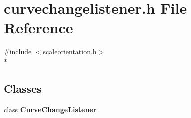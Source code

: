 \section{curvechangelistener.\+h File Reference}
\label{bk3_2curve_2curvechangelistener_8h}
{\ttfamily \#include $<$scaleorientation.\+h$>$}\\*
\subsection*{Classes}
\begin{DoxyCompactItemize}
\item 
class {\bf Curve\+Change\+Listener}
\end{DoxyCompactItemize}
